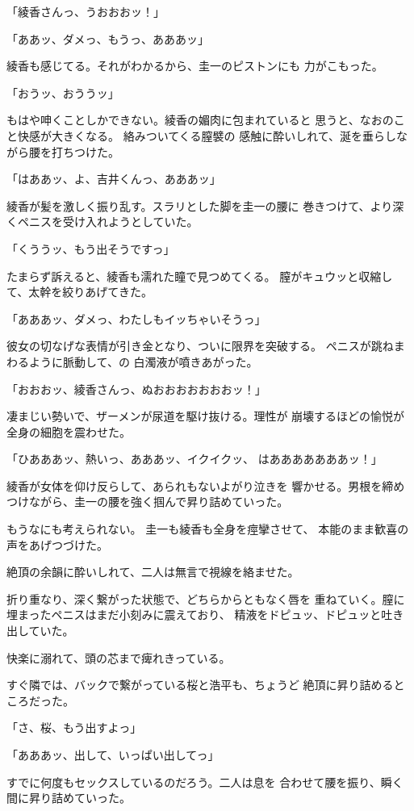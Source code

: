 ﻿\documentclass[
    book,tate,
    line_length=30zw,
    jafontsize=12pt,
    paper=b5j,
    landscape,
    ]{jlreq}
\begin{document}
「綾香さんっ、うおおおッ！」

「ああッ、ダメっ、もうっ、あああッ」

綾香も感じてる。それがわかるから、圭一のピストンにも
力がこもった。

「おうッ、おううッ」

もはや呻くことしかできない。綾香の媚肉に包まれていると
思うと、なおのこと快感が大きくなる。 絡みついてくる膣襞の
感触に酔いしれて、涎を垂らしながら腰を打ちつけた。

「はああッ、よ、吉井くんっ、あああッ」

綾香が髪を激しく振り乱す。スラリとした脚を圭一の腰に
巻きつけて、より深くペニスを受け入れようとしていた。

「くううッ、もう出そうですっ」

たまらず訴えると、綾香も濡れた瞳で見つめてくる。
膣がキュウッと収縮して、太幹を絞りあげてきた。

「あああッ、ダメっ、わたしもイッちゃいそうっ」

彼女の切なげな表情が引き金となり、ついに限界を突破する。 
ペニスが跳ねまわるように脈動して、の
白濁液が噴きあがった。

「おおおッ、綾香さんっ、ぬおおおおおおおッ！」

凄まじい勢いで、ザーメンが尿道を駆け抜ける。理性が
崩壊するほどの愉悦が全身の細胞を震わせた。

「ひあああッ、熱いっ、あああッ、イクイクッ、
はあああああああッ！」

綾香が女体を仰け反らして、あられもないよがり泣きを
響かせる。男根を締めつけながら、圭一の腰を強く掴んで昇り詰めていった。

もうなにも考えられない。 圭一も綾香も全身を痙攣させて、
本能のまま歓喜の声をあげつづけた。

絶頂の余韻に酔いしれて、二人は無言で視線を絡ませた。

折り重なり、深く繋がった状態で、どちらからともなく唇を
重ねていく。膣に埋まったペニスはまだ小刻みに震えており、
精液をドピュッ、ドピュッと吐き出していた。

快楽に溺れて、頭の芯まで痺れきっている。

すぐ隣では、バックで繋がっている桜と浩平も、ちょうど
絶頂に昇り詰めるところだった。

「さ、桜、もう出すよっ」

「あああッ、出して、いっぱい出してっ」

すでに何度もセックスしているのだろう。二人は息を
合わせて腰を振り、瞬く間に昇り詰めていった。
\end{document}
